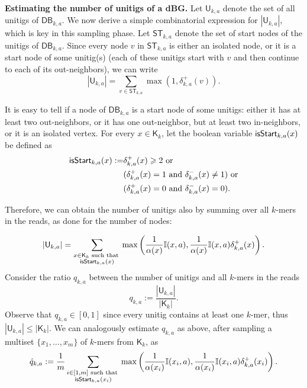 \documentclass[a4paper,11pt]{article}
\newcommand{\DB}{\mathsf{DB}_{k,a}}
\newcommand{\U}{\mathsf{U}_{k,a}}
\newcommand{\ST}{\mathsf{ST}_{k,a}}
\newcommand{\dplus}{\delta^+_{k,a}}
\newcommand{\dminus}{\delta^-_{k,a}}
\newcommand{\K}{\mathsf{K}}
\newcommand{\abu}{\alpha}
\newcommand{\isstart}{{\sf isStart}_{k,a}}
\renewcommand{\geq}{\geqslant}
\renewcommand{\leq}{\leqslant}
\begin{document}
\medskip
\noindent \textbf{Estimating the number of unitigs of a dBG.} Let $\U$ denote the set of all unitigs of $\DB$. We now derive a simple combinatorial expression for $|\U|$, which is key in this sampling phase. Let $\ST$ denote the set of start nodes of the unitigs of $\DB$. Since every node $v$ in $\ST$ is either an isolated node, or it is a start node of some unitig(s) (each of these unitigs start with $v$ and then continue to each of its out-neighbors), we can write
\[|\U| = \sum_{v \in \ST} \max(1,\dplus(v)).\]

It is easy to tell if a node of $\DB$ is a start node of some unitigs: either it has at least two out-neighbors, or it has one out-neighbor, but at least two in-neighbors, or it is an isolated vertex. For every $x \in \K_k$, let the boolean variable $\isstart(x)$ be defined as 
\begin{align*}
\isstart(x) := & \dplus(x) \geq 2 \text{ or } \\
& (\dplus(x) = 1 \text{ and } \dminus(x) \neq 1) \text{ or} \\
& (\dplus(x) = 0 \text{ and } \dminus(x) = 0).
\end{align*}

Therefore, we can obtain the number of unitigs also by summing over all $k$-mers in the reads, as done for the number of nodes:

\begin{equation}
|\U| = \sum_{\begin{subarray}{c} x \in \K_k \text{ such that } \\ \isstart(x) \end{subarray} } \max\left(\frac{1}{\abu(x)}\mathbb{I}(x,a),\frac{1}{\abu(x)}\mathbb{I}(x,a)\dplus(x)\right).
\label{eqn:number-of-unitigs}
\end{equation}
Consider the ratio $q_{k,a}$ between the number of unitigs and all $k$-mers in the reads 
\[q_{k,a} := \frac{|\U|}{|\K_k|}.\]
Observe that $q_{k,a} \in [0,1]$ since every unitig contains at least one $k$-mer, thus $|\U| \leq |\K_k|$. We can analogously estimate $q_{k,a}$ as above, after sampling a multiset $\{x_1,\dots,x_m\}$ of $k$-mers from $\K_k$, as
\[\hat{q}_{k,a} := \frac{1}{m}\displaystyle\sum_{\begin{subarray}{c}i \in [1,m] \text{ such that } \\ \isstart(x_i)\end{subarray}} \max\left(\frac{1}{\abu(x_i)}\mathbb{I}(x_i,a),\frac{1}{\abu(x_i)}\mathbb{I}(x_i,a)\dplus(x_i)\right).\]
\end{document}
